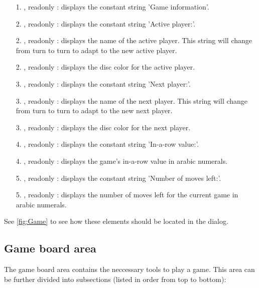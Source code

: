   \begin{enumerate}
    \item[1.] , readonly : displays the constant string
                                        'Game information'.
    \item[2.] ,   readonly : displays the constant string
                                        'Active player:'.
    \item[2.] ,   readonly : displays the name of the active
                                        player. This string will change
                                        from turn to turn to adapt to
                                        the new active player.
    \item[2.] ,   readonly : displays the disc color for the
                                        active player.
    \item[3.] ,   readonly : displays the constant string
                                        'Next player:'.
    \item[3.] ,   readonly : displays the name of the next
                                        player. This string will change
                                        from turn to turn to adapt to
                                        the new next player.
    \item[3.] ,   readonly : displays the disc color for the
                                        next player.
    \item[4.] ,   readonly : displays the constant string
                                        'In-a-row value:'.
    \item[4.] ,   readonly : displays the game's in-a-row value
                                        in arabic numerals.
    \item[5.] ,   readonly : displays the constant string
                                        'Number of moves left:'.
    \item[5.] ,   readonly : displays the number of moves left
                                        for the current game in arabic
                                        numerals.
  \end{enumerate}

  \noindent See \cref{fig:Game} to see how these elements should be located in
  the dialog.

  \subsection{Game board area}
  The game board area contains the neccessary tools to play a 
  game. This area can be further divided into subsections (listed in order
  from top to bottom):


